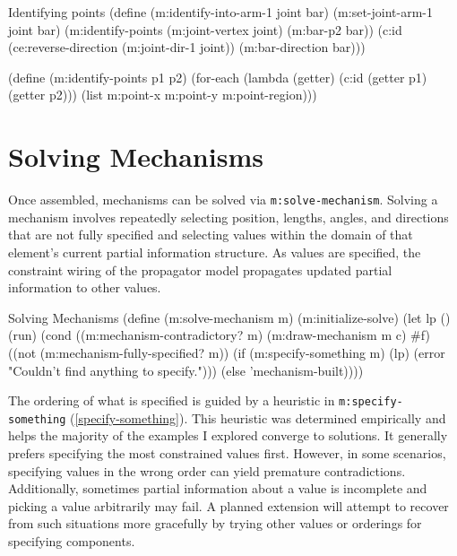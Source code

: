 \begin{code-listing}
[label=identifying-points]
{Identifying points}
(define (m:identify-into-arm-1 joint bar)
  (m:set-joint-arm-1 joint bar)
  (m:identify-points (m:joint-vertex joint) (m:bar-p2 bar))
  (c:id (ce:reverse-direction (m:joint-dir-1 joint))
        (m:bar-direction bar)))

(define (m:identify-points p1 p2)
  (for-each (lambda (getter)
              (c:id (getter p1) (getter p2)))
            (list m:point-x m:point-y m:point-region)))
\end{code-listing}

\section{Solving Mechanisms}

Once assembled, mechanisms can be solved via
\texttt{m:solve-mechanism}. Solving a mechanism involves repeatedly
selecting position, lengths, angles, and directions that are not fully
specified and selecting values within the domain of that element's
current partial information structure. As values are specified, the
constraint wiring of the propagator model propagates updated partial
information to other values.


\begin{code-listing}
[label=solve-mechanism]
{Solving Mechanisms}
(define (m:solve-mechanism m)
  (m:initialize-solve)
  (let lp ()
    (run)
    (cond ((m:mechanism-contradictory? m)
           (m:draw-mechanism m c)
           #f)
          ((not (m:mechanism-fully-specified? m))
           (if (m:specify-something m)
               (lp)
               (error "Couldn't find anything to specify.")))
          (else 'mechanism-built))))
\end{code-listing}

The ordering of what is specified is guided by a heuristic in
\texttt{m:specify-something} (\ref{specify-something}). This heuristic
was determined empirically and helps the majority of the examples I
explored converge to solutions. It generally prefers specifying the
most constrained values first. However, in some scenarios, specifying
values in the wrong order can yield premature
contradictions. Additionally, sometimes partial information about a
value is incomplete and picking a value arbitrarily may fail. A
planned extension will attempt to recover from such situations more
gracefully by trying other values or orderings for specifying
components.

